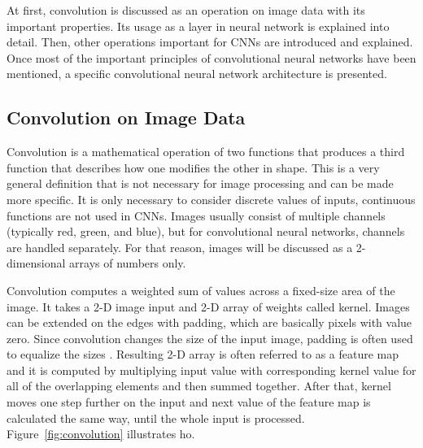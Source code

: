 At first, convolution is discussed as an operation on image data with its important properties. Its usage as a layer in neural network is explained into detail. Then, other operations important for CNNs are introduced and explained. Once most of the important principles of convolutional neural networks have been mentioned, a specific convolutional neural network architecture is presented.

\subsection{\label{sec:conv-on-image}Convolution on Image Data}

Convolution is a mathematical operation of two functions that produces a third function that describes how one modifies the other in shape. This is a very general definition that is not necessary for image processing and can be made more specific. It is only necessary to consider discrete values of inputs, continuous functions are not used in CNNs. Images usually consist of multiple channels (typically red, green, and blue), but for convolutional neural networks, channels are handled separately. For that reason, images will be discussed as a 2-dimensional arrays of numbers only.

Convolution computes a weighted sum of values across a fixed-size area of the image. It takes a 2-D image input and 2-D array of weights called kernel. Images can be extended on the edges with padding, which are basically pixels with value zero. Since convolution changes the size of the input image, padding is often used to equalize the sizes \cite{dumoulin2016guide}. Resulting 2-D array is often referred to as a feature map and it is computed by multiplying input value with corresponding kernel value for all of the overlapping elements and then summed together. After that, kernel moves one step further on the input and next value of the feature map is calculated the same way, until the whole input is processed. Figure~\ref{fig:convolution} illustrates ho.

